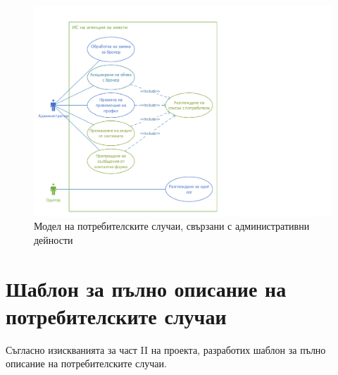 \documentclass[a4paper]{article}
\begin{document}
        \begin{figure}[h]
        \centering
        \includegraphics[scale=1]{uc2d}
        \caption{Модел на потребителските случаи, свързани с административни дейности}
        \end{figure}

\clearpage
\section*{Шаблон за пълно описание на потребителските случаи}

Съгласно изискванията за част II на проекта, разработих шаблон за пълно описание на потребителските случаи.
\end{document}
